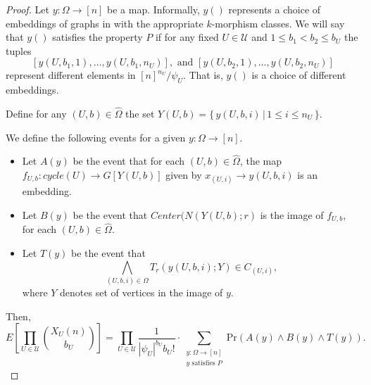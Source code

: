 \documentclass[11pt,notitlepage,a4paper]{article}
\theoremstyle{definition}
\begin{document}
\begin{proof}
	Let $y: \Omega \rightarrow [n]$ be a map. Informally, $y()$
	represents a choice of embeddings of graphs in with the appropriate
	$k$-morphism classes. We will say that $y()$ satisfies the property
	$P$ if for any fixed $U\in \mathcal{U}$ and $1\leq b_1<b_2\leq b_{U}$
	the tuples
	\[ [y(U,b_1,1), \dots, y(U,b_1,n_U)], \text{ and }
	[y(U,b_2,1), \dots, y(U,b_2,n_U)] \]
	represent different elements in $[n]^{n_U}/\psi_U$. That is, $y()$ is 
	a choice of different embeddings.\par
	Define for any $(U,b)\in \widehat{\Omega}$
	the set $Y(U,b)=\{ \, y(U,b,i) \, | \, 1\leq i \leq n_U \, \}$.
	
	We define the following events for a given $y:\Omega\rightarrow [n]$.
	\begin{itemize}
		\item Let $A(y)$ be the event that for each $(U,b)\in \widehat{\Omega}$,
		the map $f_{U,b}:cycle(U)\rightarrow G[Y(U,b)]$ given
		by $x_{(U,i)} \rightarrow y(U,b,i)$ is an embedding. 	
		\item Let $B(y)$ be the event that $Center(N(Y(U,b);r)$ is 
		the image of $f_{U,b}$,	for each $(U,b)\in \widehat{\Omega}$.
		\item Let $T(y)$ be the event that 
		\[\bigwedge_{(U,b,i)\in \Omega} T_r(y(U,b,i); Y)\in C_{(U,i)}, \]
		where $Y$ denotes set of vertices in the image of $y$.  
	\end{itemize}
	Then,
	\[ E\left[\prod_{U\in \mathcal{U}}
	\binom{X_{U}(n)}{b_{U}}\right] = \prod_{U\in \mathcal{U}} 
	\frac{1}{|\psi_U|^{b_U}b_U!} \cdot
	\sum_{\substack{y:\Omega \rightarrow [n]\\y \text{ satisfies }P}}
	\mathrm{Pr}(A(y)\wedge B(y)\wedge T(y)). \]
	

\end{proof}
\end{document}
